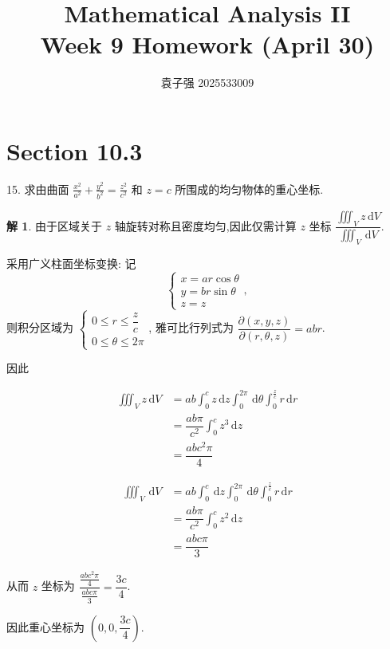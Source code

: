 \documentclass[a4paper,12pt]{article}
\title{Mathematical Analysis II\\Week 9 Homework (April 30)}
\author{袁子强\hspace{1cm} 2025533009}
\theoremstyle{definition}
\newtheorem*{sol}{解}
\begin{document}
\maketitle

\section*{Section 10.3}
15. 求由曲面 $\displaystyle\frac{x^2}{a^2} + \frac{y^2}{b^2} = \frac{z^2}{c^2}$ 和 $z = c$ 所围成的均匀物体的重心坐标.
\begin{sol}
    由于区域关于 $z$ 轴旋转对称且密度均匀,因此仅需计算 $z$ 坐标 $\dfrac{\iiint_V z\,\mathrm{d}V}{\iiint_V\,\mathrm{d}V}$.

    采用广义柱面坐标变换: 记
    $$\begin{cases}
        x=ar\cos\theta \\
        y=br\sin\theta \\
        z=z
    \end{cases},$$
    则积分区域为 $\begin{cases}
        0\leq r \leq \dfrac{z}{c} \\
        0\leq \theta \leq 2\pi
    \end{cases}$, 雅可比行列式为 $\dfrac{\partial(x,y,z)}{\partial(r,\theta,z)}=abr$.

    因此

    \begin{align*}
        \iiint_V z\,\mathrm{d}V
         & =ab\int_0^c z\,\mathrm{d}z\int_0^{2\pi}\,\mathrm{d}\theta\int_0^{\frac{z}{c}} r\,\mathrm{d}r \\
         & =\dfrac{ab\pi}{c^2}\int_0^c z^3\,\mathrm{d}z                                                  \\
         & =\dfrac{abc^2\pi}{4}
    \end{align*}

    \begin{align*}
        \iiint_V \,\mathrm{d}V
         & =ab\int_0^c \,\mathrm{d}z\int_0^{2\pi}\,\mathrm{d}\theta\int_0^{\frac{z}{c}} r\,\mathrm{d}r \\
         & =\dfrac{ab\pi}{c^2}\int_0^c z^2\,\mathrm{d}z                                                 \\
         & =\dfrac{abc\pi}{3}
    \end{align*}

    从而 $z$ 坐标为 $\dfrac{\frac{abc^2\pi}{4}}{\frac{abc\pi}{3}}=\dfrac{3c}{4}$.

    因此重心坐标为 $\left(0,0,\dfrac{3c}{4}\right)$.
\end{sol}
\end{document}
